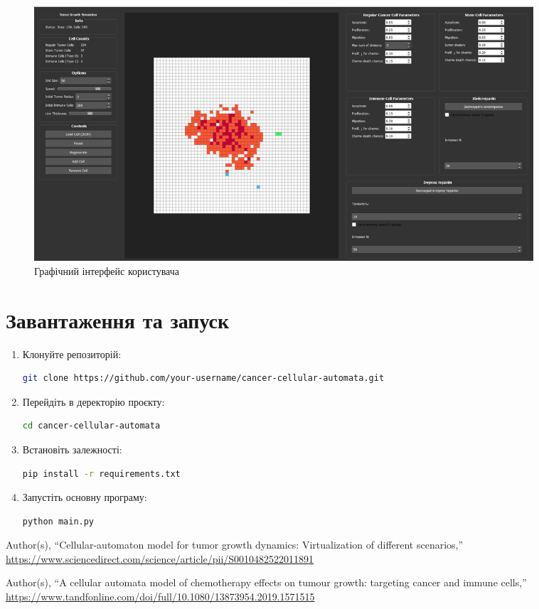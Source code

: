 \documentclass[12pt]{article}
\begin{document}
\begin{figure}[h] %
    \centering
    \includegraphics[width=0.9\textwidth]{gui.png} %
    \caption{Графічний інтерфейс користувача}
    \label{fig:example}
\end{figure}


\section{Завантаження та запуск}

\begin{enumerate}
    \item Клонуйте репозиторій:
    \begin{lstlisting}[language=bash]
git clone https://github.com/your-username/cancer-cellular-automata.git
    \end{lstlisting}
    
    \item Перейдіть в деректорію проєкту:
    \begin{lstlisting}[language=bash]
cd cancer-cellular-automata
    \end{lstlisting}
    
    \item Встановіть залежності:
    \begin{lstlisting}[language=bash]
pip install -r requirements.txt
    \end{lstlisting}
    
    \item Запустіть основну програму:
    \begin{lstlisting}[language=bash]
python main.py
    \end{lstlisting}
\end{enumerate}

\begin{thebibliography}{99}

Author(s), ``Cellular-automaton model for tumor growth dynamics: Virtualization of different scenarios,''
\url{https://www.sciencedirect.com/science/article/pii/S0010482522011891}

Author(s), ``A cellular automata model of chemotherapy effects on tumour growth: targeting cancer and immune cells,''
\url{https://www.tandfonline.com/doi/full/10.1080/13873954.2019.1571515}
\end{thebibliography}
\end{document}
